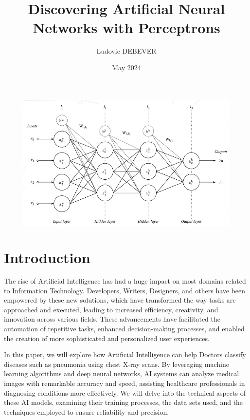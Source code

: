 \documentclass{article}
\title{Discovering Artificial Neural Networks with Perceptrons}
\author{Ludovic DEBEVER}
\date{May 2024}
\begin{document}
\maketitle

 
\begin{figure}[!h]
    \centering
    \includegraphics[width=1\linewidth]{assets/cover.png}
    \label{fig:cover}
\end{figure}

\newpage

\section{Introduction}

The rise of Artificial Intelligence has had a huge impact on most domains related to Information Technology. Developers, Writers, Designers, and others have been empowered by these new solutions, which have transformed the way tasks are approached and executed, leading to increased efficiency, creativity, and innovation across various fields. These advancements have facilitated the automation of repetitive tasks, enhanced decision-making processes, and enabled the creation of more sophisticated and personalized user experiences.

In this paper, we will explore how Artificial Intelligence can help Doctors classify diseases such as pneumonia using chest X-ray scans. By leveraging machine learning algorithms and deep neural networks, AI systems can analyze medical images with remarkable accuracy and speed, assisting healthcare professionals in diagnosing conditions more effectively. We will delve into the technical aspects of these AI models, examining their training processes, the data sets used, and the techniques employed to ensure reliability and precision.
\end{document}
